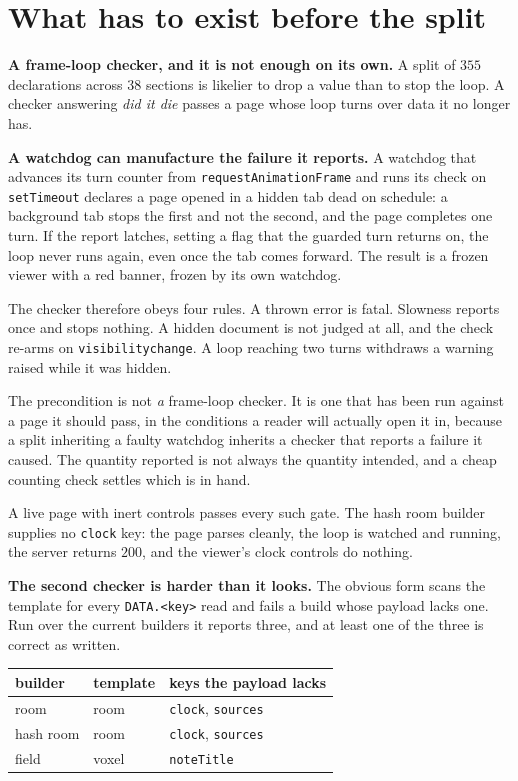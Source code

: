 \section{What has to exist before the split}

\textbf{A frame-loop checker, and it is not enough on its own.} A split of \(355\) declarations across \(38\) sections is likelier to drop a value than to stop the loop. A checker answering \emph{did it die} passes a page whose loop turns over data it no longer has.

\textbf{A watchdog can manufacture the failure it reports.} A watchdog that advances its turn counter from \texttt{requestAnimationFrame} and runs its check on \texttt{setTimeout} declares a page opened in a hidden tab dead on schedule: a background tab stops the first and not the second, and the page completes one turn. If the report latches, setting a flag that the guarded turn returns on, the loop never runs again, even once the tab comes forward. The result is a frozen viewer with a red banner, frozen by its own watchdog.

The checker therefore obeys four rules. A thrown error is fatal. Slowness reports once and stops nothing. A hidden document is not judged at all, and the check re-arms on \texttt{visibilitychange}. A loop reaching two turns withdraws a warning raised while it was hidden.

The precondition is not \emph{a} frame-loop checker. It is one that has been run against a page it should pass, in the conditions a reader will actually open it in, because a split inheriting a faulty watchdog inherits a checker that reports a failure it caused. The quantity reported is not always the quantity intended, and a cheap counting check settles which is in hand.

A live page with inert controls passes every such gate. The hash room builder supplies no \texttt{clock} key: the page parses cleanly, the loop is watched and running, the server returns \(200\), and the viewer's clock controls do nothing.

\textbf{The second checker is harder than it looks.} The obvious form scans the template for every \texttt{DATA.<key>} read and fails a build whose payload lacks one. Run over the current builders it reports three, and at least one of the three is correct as written.

\begin{center}
\begin{tabular}{@{}lll@{}}
\toprule
builder & template & keys the payload lacks \\
\midrule
room & room & \texttt{clock}, \texttt{sources} \\
hash room & room & \texttt{clock}, \texttt{sources} \\
field & voxel & \texttt{noteTitle} \\
\bottomrule
\end{tabular}
\end{center}

